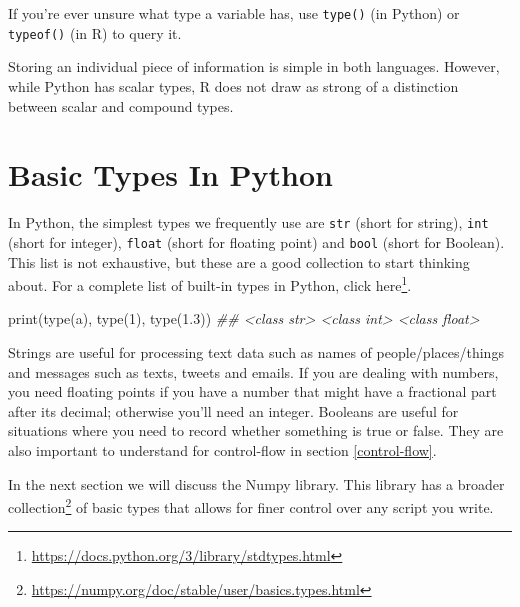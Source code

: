 \documentclass[
  12pt,
  krantz2]{krantz}
\makeatletter
\newenvironment{Shaded}{\begin{snugshade}}{\end{snugshade}}
\newcommand{\BuiltInTok}[1]{#1}
\newcommand{\CommentTok}[1]{\textcolor[rgb]{0.37,0.37,0.37}{\textit{#1}}}
\newcommand{\DecValTok}[1]{\textcolor[rgb]{0.06,0.06,0.06}{#1}}
\newcommand{\FloatTok}[1]{\textcolor[rgb]{0.06,0.06,0.06}{#1}}
\newcommand{\NormalTok}[1]{#1}
\newcommand{\StringTok}[1]{\textcolor[rgb]{0.5,0.5,0.5}{#1}}
\renewcommand{\href}[2]{#2\footnote{\url{#1}}}
\newenvironment{kframe}{%
\medskip{}
\setlength{\fboxsep}{.8em}
 \def\at@end@of@kframe{}%
 \ifinner\ifhmode%
  \def\at@end@of@kframe{\end{minipage}}%
  \begin{minipage}{\columnwidth}%
 \fi\fi%
 \def\FrameCommand##1{\hskip\@totalleftmargin \hskip-\fboxsep
 \colorbox{shadecolor}{##1}\hskip-\fboxsep
     \hskip-\linewidth \hskip-\@totalleftmargin \hskip\columnwidth}%
 \MakeFramed {\advance\hsize-\width
   \@totalleftmargin\z@ \linewidth\hsize
   \@setminipage}}%
 {\par\unskip\endMakeFramed%
 \at@end@of@kframe}
\renewenvironment{Shaded}{\begin{kframe}}{\end{kframe}}
\makeatother
\begin{document}
If you're ever unsure what type a variable has, use \texttt{type()} (in Python) or \texttt{typeof()} (in R) to query it.

Storing an individual piece of information is simple in both languages. However, while Python has scalar types, R does not draw as strong of a distinction between scalar and compound types.

\hypertarget{basic-types-in-python}{%
\section{Basic Types In Python}\label{basic-types-in-python}}

In Python, the simplest types we frequently use are \texttt{str} (short for string), \texttt{int} (short for integer), \texttt{float} (short for floating point) and \texttt{bool} (short for Boolean). This list is not exhaustive, but these are a good collection to start thinking about. For a complete list of built-in types in Python, click \href{https://docs.python.org/3/library/stdtypes.html}{here}.

\begin{Shaded}
\begin{Highlighting}[]
\BuiltInTok{print}\NormalTok{(}\BuiltInTok{type}\NormalTok{(}\StringTok{\textquotesingle{}a\textquotesingle{}}\NormalTok{), }\BuiltInTok{type}\NormalTok{(}\DecValTok{1}\NormalTok{), }\BuiltInTok{type}\NormalTok{(}\FloatTok{1.3}\NormalTok{))}
\CommentTok{\#\# \textless{}class \textquotesingle{}str\textquotesingle{}\textgreater{} \textless{}class \textquotesingle{}int\textquotesingle{}\textgreater{} \textless{}class \textquotesingle{}float\textquotesingle{}\textgreater{}}
\end{Highlighting}
\end{Shaded}

Strings are useful for processing text data such as names of people/places/things and messages such as texts, tweets and emails. If you are dealing with numbers, you need floating points if you have a number that might have a fractional part after its decimal; otherwise you'll need an integer. Booleans are useful for situations where you need to record whether something is true or false. They are also important to understand for control-flow in section \ref{control-flow}.

In the next section we will discuss the Numpy library. This library has a \href{https://numpy.org/doc/stable/user/basics.types.html}{broader collection} of basic types that allows for finer control over any script you write.
\end{document}
